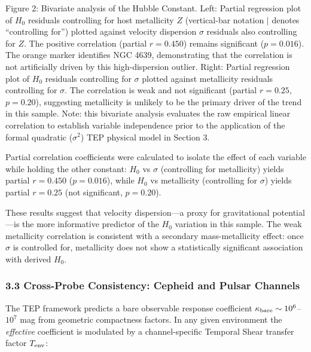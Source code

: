 \documentclass[
]{article}
\begin{document}
Figure 2: Bivariate analysis of the Hubble Constant. Left: Partial
regression plot of \(H_0\) residuals controlling for host metallicity
\(Z\) (vertical-bar notation \(|\) denotes ``controlling for'') plotted
against velocity dispersion \(\sigma\) residuals also controlling for
\(Z\). The positive correlation (partial \(r=0.450\)) remains
significant (\(p=0.016\)). The orange marker identifies NGC 4639,
demonstrating that the correlation is not artificially driven by this
high-dispersion outlier. Right: Partial regression plot of \(H_0\)
residuals controlling for \(\sigma\) plotted against metallicity
residuals controlling for \(\sigma\). The correlation is weak and not
significant (partial \(r=0.25\), \(p=0.20\)), suggesting metallicity is
unlikely to be the primary driver of the trend in this sample. Note:
this bivariate analysis evaluates the raw empirical linear correlation
to establish variable independence prior to the application of the
formal quadratic (\(\sigma^2\)) TEP physical model in Section 3.

Partial correlation coefficients were calculated to isolate the effect
of each variable while holding the other constant: \(H_0\) vs \(\sigma\)
(controlling for metallicity) yields partial \(r = 0.450\)
(\(p = 0.016\)), while \(H_0\) vs metallicity (controlling for
\(\sigma\)) yields partial \(r = 0.25\) (not significant, \(p = 0.20\)).

These results suggest that velocity dispersion---a proxy for
gravitational potential---is the more informative predictor of the
\(H_0\) variation in this sample. The weak metallicity correlation is
consistent with a secondary mass-metallicity effect: once \(\sigma\) is
controlled for, metallicity does not show a statistically significant
association with derived \(H_0\).

\begin{quote}
\end{quote}

\subsubsection{3.3 Cross-Probe Consistency: Cepheid and Pulsar
Channels}\label{cross-probe-consistency-cepheid-and-pulsar-channels}

The TEP framework predicts a bare observable response coefficient
\(\kappa_{\rm bare} \sim 10^6\)--\(10^7\) mag from geometric compactness
factors. In any given environment the \emph{effective} coefficient is
modulated by a channel-specific Temporal Shear transfer factor
\(T_{\rm env}\):
\end{document}
